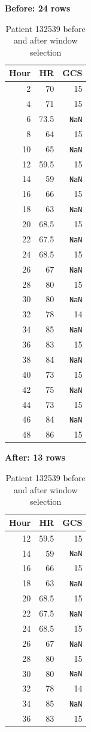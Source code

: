 \documentclass[11pt,a4paper]{article}
\begin{document}
\begin{table}[H]
\centering
\caption{Patient 132539 before and after window selection}\label{tab:window}
\begin{minipage}[t]{0.47\textwidth}
\centering
\textbf{Before: 24 rows}\par\medskip
\begin{tabular}{rrr}
\toprule
Hour & HR & GCS\\
\midrule
2 & 70 & 15 \\
4 & 71 & 15 \\
6 & 73.5 & \texttt{NaN} \\
8 & 64 & 15 \\
10 & 65 & \texttt{NaN} \\
12 & 59.5 & 15 \\
14 & 59 & \texttt{NaN} \\
16 & 66 & 15 \\
18 & 63 & \texttt{NaN} \\
20 & 68.5 & 15 \\
22 & 67.5 & \texttt{NaN} \\
24 & 68.5 & 15 \\
26 & 67 & \texttt{NaN} \\
28 & 80 & 15 \\
30 & 80 & \texttt{NaN} \\
32 & 78 & 14 \\
34 & 85 & \texttt{NaN} \\
36 & 83 & 15 \\
38 & 84 & \texttt{NaN} \\
40 & 73 & 15 \\
42 & 75 & \texttt{NaN} \\
44 & 73 & 15 \\
46 & 84 & \texttt{NaN} \\
48 & 86 & 15 \\
\bottomrule
\end{tabular}
\end{minipage}\hfill
\begin{minipage}[t]{0.47\textwidth}
\centering
\textbf{After: 13 rows}\par\medskip
\begin{tabular}{rrr}
\toprule
Hour & HR & GCS\\
\midrule
12 & 59.5 & 15 \\
14 & 59 & \texttt{NaN} \\
16 & 66 & 15 \\
18 & 63 & \texttt{NaN} \\
20 & 68.5 & 15 \\
22 & 67.5 & \texttt{NaN} \\
24 & 68.5 & 15 \\
26 & 67 & \texttt{NaN} \\
28 & 80 & 15 \\
30 & 80 & \texttt{NaN} \\
32 & 78 & 14 \\
34 & 85 & \texttt{NaN} \\
36 & 83 & 15 \\
\bottomrule
\end{tabular}
\end{minipage}
\end{table}
\end{document}
